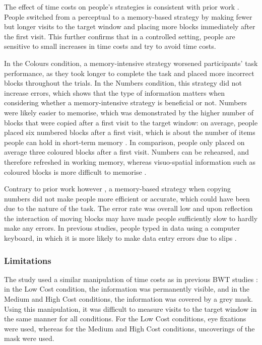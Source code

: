
The effect of time costs on people's strategies is consistent with prior work \citep{Gray2006, Morgan2009, Waldron2007}. People switched from a perceptual to a memory-based strategy by making fewer but longer visits to the target window and placing more blocks immediately after the first visit. This further confirms that in a controlled setting, people are sensitive to small increases in time costs and try to avoid time costs.

In the Colours condition, a memory-intensive strategy worsened participants' task performance, as they took longer to complete the task and placed more incorrect blocks throughout the trials. In the Numbers condition, this strategy did not increase errors, which shows that the type of information matters when considering whether a memory-intensive strategy is beneficial or not. Numbers were likely easier to memorise, which was demonstrated by the higher number of blocks that were copied after a first visit to the target window: on average, people placed six numbered blocks after a first visit, which is about the number of items people can hold in short-term memory \citep{Miller1956}. In comparison, people only placed on average three coloured blocks after a first visit. Numbers can be rehearsed, and therefore refreshed in working memory, whereas visuo-spatial information such as coloured blocks is more difficult to memorise \citep{Baddeley1974}. 

Contrary to prior work however \citep{Gray2004, Soboczenski2013}, a memory-based strategy when copying numbers did not make people more efficient or accurate, which could have been due to the nature of the task. The error rate was overall low and upon reflection the interaction of moving blocks may have made people sufficiently slow to hardly make any errors. In previous studies, people typed in data using a computer keyboard, in which it is more likely to make data entry errors due to slips \citep{Oladimeji2011}.
 
 \subsubsection{Limitations}
The study used a similar manipulation of time costs as in previous BWT studies \citep{Morgan2009, Patrick2014, Waldron2007, Waldron2011}: in the Low Cost condition, the information was permanently visible, and in the Medium and High Cost conditions, the information was covered by a grey mask. Using this manipulation, it was difficult to measure visits to the target window in the same manner for all conditions. For the Low Cost conditions, eye fixations were used, whereas for the Medium and High Cost conditions, uncoverings of the mask were used. 

